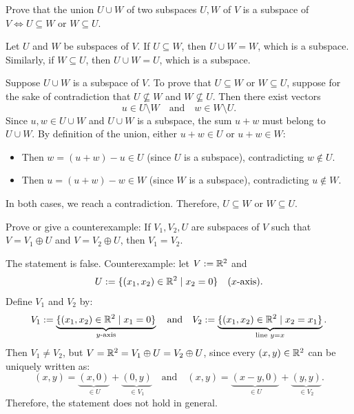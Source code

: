 \begin{xrcs}
  Prove that the union $U \cup W$ of two subspaces $U, W$ of $V$ is a subspace of $V \iff U \subseteq W$ or $W \subseteq U$.

  \begin{xprf}
    \Leftarrowdirection Let $U$ and $W$ be subspaces of $V$. If $U \subseteq W$, then $U \cup W = W$, which is a subspace. Similarly, if $W \subseteq U$, then $U \cup W = U$, which is a subspace.

    \Rightarrowdirection Suppose $U \cup W$ is a subspace of $V$. To prove that $U \subseteq W$ or $W \subseteq U$, suppose for the sake of contradiction that $U \not\subseteq W$ and $W \not\subseteq U$.
    Then there exist vectors
    \[
      u \in U \setminus W \quad \text{and} \quad w \in W \setminus U.
    \]
    Since $u, w \in U \cup W$ and $U \cup W$ is a subspace, the sum $u+w$ must belong to $U \cup W$.
    By definition of the union, either $u+w \in U$ or $u+w \in W$:
    \begin{itemize}
      \item {} Then $w = (u+w) - u \in U$ (since $U$ is a subspace), contradicting $w \notin U$.
      \item {} Then $u = (u+w) - w \in W$ (since $W$ is a subspace), contradicting $u \notin W$.
    \end{itemize}
    In both cases, we reach a contradiction. Therefore, $U \subseteq W$ or $W \subseteq U$.
  \end{xprf}
\end{xrcs}

\begin{xrcs}
  Prove or give a counterexample: If $V_1, V_2, U$ are subspaces of $V$ such that $V = V_1 \oplus U$ and $V = V_2 \oplus U$, then $V_1 = V_2$.

  \begin{xsol}
    The statement is false. Counterexample: let $V := \mathbb{R}^2$ and
    \begin{equation}
      U := \{ (x_1, x_2) \in \mathbb{R}^2 \mid x_2 = 0 \} \quad \text{($x$-axis)}.
    \end{equation}
    Define $V_1$ and $V_2$ by:
    \[
      V_1 := \underbrace{\{(x_1, x_2) \in \mathbb{R}^2 \mid x_1 = 0 \}}_{\text{$y$-axis}} \quad \text{and} \quad
      V_2 := \underbrace{\{ (x_1, x_2) \in \mathbb{R}^2 \mid x_2 = x_1 \}}_{\text{line } y=x}.
    \]
    Then $V_1 \neq V_2$, but $V = \mathbb{R}^2 = V_1 \oplus U = V_2 \oplus U$, since every $(x,y) \in \mathbb{R}^2$ can be uniquely written as:
    \begin{equation}
      (x,y) = \underbrace{(x,0)}_{\in U} + \underbrace{(0,y)}_{\in V_1} \quad \text{and} \quad (x,y) = \underbrace{(x-y,0)}_{\in U} + \underbrace{(y,y)}_{\in V_2}.
    \end{equation}
    Therefore, the statement does not hold in general.
  \end{xsol}
\end{xrcs}

